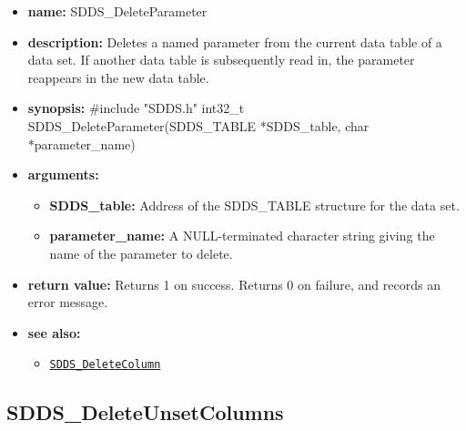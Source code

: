 \documentclass[11pt]{article}
\newcommand{\progref}[1]{\hyperref[SDDS_#1]{\tt SDDS\_#1}}
\begin{document}
\begin{itemize}
\item {\bf name:}\newline
SDDS\_DeleteParameter
\item {\bf description:}\newline
Deletes a named parameter from the current data table of a data set. If another data table is subsequently read in, the parameter reappears in the new data table.
\item {\bf synopsis:} \#include "SDDS.h"\newline
int32\_t SDDS\_DeleteParameter(SDDS\_TABLE *SDDS\_table, char *parameter\_name)
\item {\bf arguments:}
\begin{itemize}
\item {\bf SDDS\_table:} Address of the SDDS\_TABLE structure for the data set.
\item {\bf parameter\_name:} A NULL-terminated character string giving the name of the parameter to delete.
\end{itemize}
\item {\bf return value:}\newline
Returns 1 on success. Returns 0 on failure, and records an error message.
\item {\bf see also:}
\begin{itemize}
\item \progref{DeleteColumn}
\end{itemize}
\end{itemize}

\subsection{SDDS\_DeleteUnsetColumns}
\label{SDDS_DeleteUnsetColumns}
\end{document}
